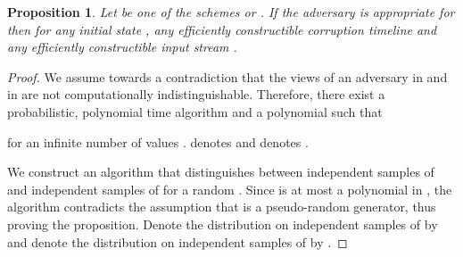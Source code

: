 \documentclass[letterpaper,11pt]{article}
\newtheorem{proposition}[theorem]{Proposition}
\begin{document}
\begin{proposition}
\label{prop:indis_pi_int}
Let  be one of the schemes  or . If the adversary is appropriate for  then  for  any initial state , any efficiently constructible corruption timeline  and any efficiently constructible input stream . 
\end{proposition}
\begin{proof}
We assume towards a contradiction that the views of an adversary in  and in  are not computationally indistinguishable.
Therefore, there exist a probabilistic, polynomial time algorithm  and a polynomial  such that 

for an infinite number of values .  denotes  and  denotes .


We construct an algorithm  that distinguishes between  independent samples of  and  independent samples of  for a random . Since  is at most a polynomial in , the algorithm  contradicts the assumption that  is a pseudo-random generator, thus proving the proposition. Denote the distribution on  independent samples of  by  and denote the distribution on  independent samples of  by .


\end{proof}
\end{document}
